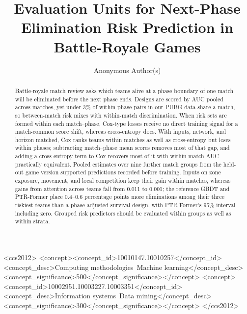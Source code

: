 \documentclass[sigconf,anonymous]{acmart}
\begin{document}
\title{Evaluation Units for Next-Phase Elimination Risk Prediction in Battle-Royale Games}
\renewcommand{\shorttitle}{Evaluation Units for Next-Phase Elimination Prediction}

\author{Anonymous Author(s)}

\begin{abstract}
Battle-royale match review asks which teams alive at a phase boundary of one match will be eliminated before the next phase ends. Designs are scored by AUC pooled across matches, yet under 3\% of within-phase pairs in our PUBG data share a match, so between-match risk mixes with within-match discrimination. When risk sets are formed within each match--phase, Cox-type losses receive no direct training signal for a match-common score shift, whereas cross-entropy does. With inputs, network, and horizon matched, Cox ranks teams within matches as well as cross-entropy but loses within phases; subtracting match--phase mean scores removes most of that gap, and adding a cross-entropy term to Cox recovers most of it with within-match AUC practically equivalent. Pooled estimates over nine further match groups from the held-out game version supported predictions recorded before training. Inputs on zone exposure, movement, and local competition keep their gain within matches, whereas gains from attention across teams fall from 0.011 to 0.001; the reference GBDT and PTR-Former place 0.4--0.6 percentage points more eliminations among their three riskiest teams than a phase-adjusted survival design, with PTR-Former's 95\% interval including zero. Grouped risk predictors should be evaluated within groups as well as within strata.
\end{abstract}
\begin{CCSXML}
<ccs2012>
<concept><concept_id>10010147.10010257</concept_id><concept_desc>Computing methodologies~Machine learning</concept_desc><concept_significance>500</concept_significance></concept>
<concept><concept_id>10002951.10003227.10003351</concept_id><concept_desc>Information systems~Data mining</concept_desc><concept_significance>300</concept_significance></concept>
</ccs2012>
\end{CCSXML}
\maketitle
\end{document}
